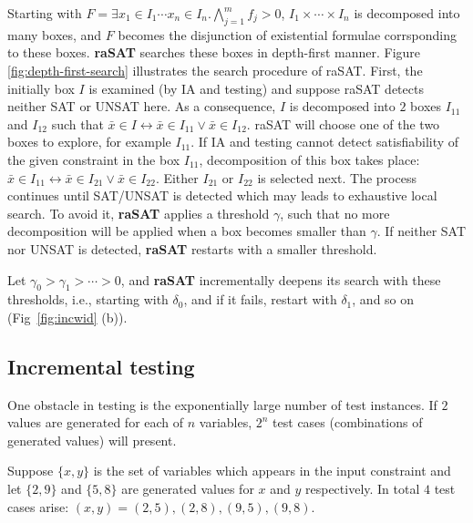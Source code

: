 Starting with $F = \exists x_1 \in I_1 \cdots x_n \in I_n. \bigwedge \limits_{j=1}^m f_j > 0$, 
$I_1 \times \cdots \times I_n$ is decomposed into many boxes, 
and $F$ becomes the disjunction of existential formulae corrsponding to these boxes. 
{\bf raSAT} searches these boxes in depth-first manner. Figure \ref{fig:depth-first-search} illustrates the search procedure of raSAT. First, the initially box $I$ is examined (by IA and testing) and suppose raSAT detects neither SAT or UNSAT here. As a consequence, $I$ is decomposed into $2$ boxes $I_{11}$ and $I_{12}$ such that $\bar{x} \in I \leftrightarrow \bar{x} \in I_{11} \vee \bar{x} \in I_{12}$. raSAT will choose one of the two boxes to explore, for example $I_{11}$. If IA and testing cannot detect satisfiability of the given constraint in the box $I_{11}$, decomposition of this box takes place:  $\bar{x} \in I_{11} \leftrightarrow \bar{x} \in I_{21} \vee \bar{x} \in I_{22}$. Either $I_{21}$ or $I_{22}$ is selected next. The process continues until SAT/UNSAT is detected which may leads to exhaustive local search.
To avoid it, {\bf raSAT} applies a threshold $\gamma$, such that no more decomposition will be 
applied when a box becomes smaller than $\gamma$. 
If neither SAT nor UNSAT is detected, {\bf raSAT} restarts with a smaller threshold. 

Let $\gamma_0 > \gamma_1 > \cdots > 0$, and {\bf raSAT} incrementally deepens its search 
with these thresholds, i.e., starting with $\delta_0$, and if it fails, restart with $\delta_1$, 
and so on (Fig~\ref{fig:incwid} (b)). 

\begin{comment}

\begin{figure}[ht]
\centering
\texttt{[image: depth-first-search.jpg]} 
\caption{\textbf{raSAT} design} 
\label{fig:depth-first-search} 
\end{figure} 
\end{comment}
\subsection{Incremental testing}
One obstacle in testing is the exponentially large number of test instances. If $2$ values are generated for each of $n$ variables, $2^n$ test cases (combinations of generated values) will present. 
\begin{example}
Suppose $\{x, y\}$ is the set of variables which appears in the input constraint and let $\{2, 9\}$ and $\{5, 8\}$ are generated values for $x$ and $y$ respectively. In total $4$ test cases arise: $(x, y) = (2, 5), (2, 8), (9, 5), (9, 8)$.
\end{example}

